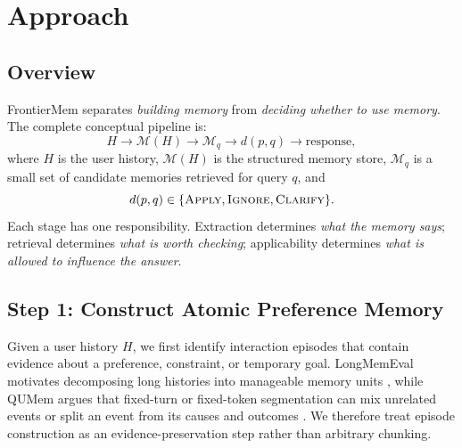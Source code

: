 \documentclass[11pt]{article}
\begin{document}
\section{Approach}

\subsection{Overview}

FrontierMem separates \emph{building memory} from \emph{deciding whether to use memory}. The complete conceptual pipeline is:
\[
H
\longrightarrow
\mathcal{M}(H)
\longrightarrow
\mathcal{M}_q
\longrightarrow
d(p,q)
\longrightarrow
\text{response},
\]
where $H$ is the user history, $\mathcal{M}(H)$ is the structured memory store, $\mathcal{M}_q$ is a small set of candidate memories retrieved for query $q$, and
\[
d(p,q)\in\{\textsc{Apply},\textsc{Ignore},\textsc{Clarify}\}.
\]
Each stage has one responsibility. Extraction determines \emph{what the memory says}; retrieval determines \emph{what is worth checking}; applicability determines \emph{what is allowed to influence the answer}.

\subsection{Step 1: Construct Atomic Preference Memory}

Given a user history $H$, we first identify interaction episodes that contain evidence about a preference, constraint, or temporary goal. LongMemEval motivates decomposing long histories into manageable memory units \cite{wu2025longmemeval}, while QUMem argues that fixed-turn or fixed-token segmentation can mix unrelated events or split an event from its causes and outcomes \cite{wang2026qumem}. We therefore treat episode construction as an evidence-preservation step rather than arbitrary chunking.
\end{document}
